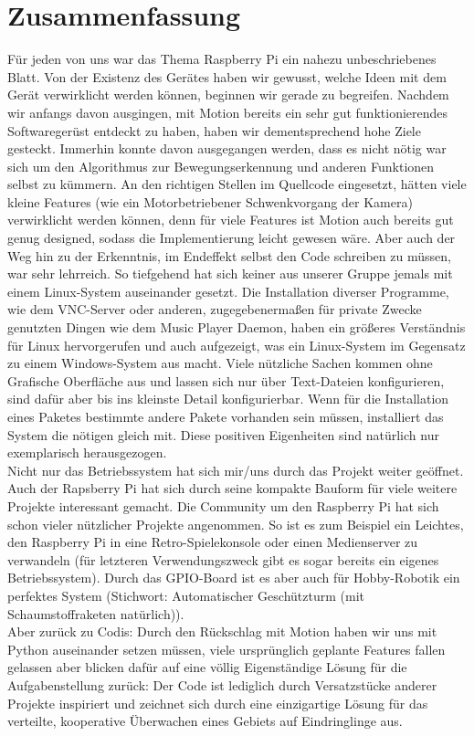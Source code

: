 \documentclass[journal]{IEEEtran}
\begin{document}
\section{Zusammenfassung}
Für jeden von uns war das Thema Raspberry Pi ein nahezu unbeschriebenes Blatt. Von der Existenz des Gerätes haben wir gewusst, welche Ideen mit dem Gerät verwirklicht werden können, beginnen wir gerade zu begreifen. Nachdem wir anfangs davon ausgingen, mit Motion bereits ein sehr gut funktionierendes Softwaregerüst entdeckt zu haben, haben wir dementsprechend hohe Ziele gesteckt. Immerhin konnte davon ausgegangen werden, dass es nicht nötig war sich um den Algorithmus zur Bewegungserkennung und anderen Funktionen selbst zu kümmern. An den richtigen Stellen im Quellcode eingesetzt, hätten viele kleine Features (wie ein Motorbetriebener Schwenkvorgang der Kamera) verwirklicht werden können, denn für viele Features ist Motion auch bereits gut genug designed, sodass die Implementierung leicht gewesen wäre. Aber auch der Weg hin zu der Erkenntnis, im Endeffekt selbst den Code schreiben zu müssen, war sehr lehrreich. So tiefgehend hat sich keiner aus unserer Gruppe jemals mit einem Linux-System auseinander gesetzt. Die Installation diverser Programme, wie dem VNC-Server oder anderen, zugegebenermaßen für private Zwecke genutzten Dingen wie dem Music Player Daemon, haben ein größeres Verständnis für Linux hervorgerufen und auch aufgezeigt, was ein Linux-System im Gegensatz zu einem Windows-System aus macht. Viele nützliche Sachen kommen ohne Grafische Oberfläche aus und lassen sich nur über Text-Dateien konfigurieren, sind dafür aber bis ins kleinste Detail konfigurierbar. Wenn für die Installation eines Paketes bestimmte andere Pakete vorhanden sein müssen, installiert das System die nötigen gleich mit. Diese positiven Eigenheiten sind natürlich nur exemplarisch herausgezogen. \\Nicht nur das Betriebssystem hat sich mir/uns durch das Projekt weiter geöffnet. Auch der Rapsberry Pi hat sich durch seine kompakte Bauform für viele weitere Projekte interessant gemacht. Die Community um den Raspberry Pi hat sich schon vieler nützlicher Projekte angenommen. So ist es zum Beispiel ein Leichtes, den Raspberry Pi in eine Retro-Spielekonsole oder einen Medienserver zu verwandeln (für letzteren Verwendungszweck gibt es sogar bereits ein eigenes Betriebssystem). Durch das GPIO-Board ist es aber auch für Hobby-Robotik ein perfektes System (Stichwort: Automatischer Geschützturm (mit Schaumstoffraketen natürlich)). \\Aber zurück zu Codis: Durch den Rückschlag mit Motion haben wir uns mit Python auseinander setzen müssen, viele ursprünglich geplante Features fallen gelassen aber blicken dafür auf eine völlig Eigenständige Lösung für die Aufgabenstellung zurück: Der Code ist lediglich durch Versatzstücke anderer Projekte inspiriert und zeichnet sich durch eine einzigartige Lösung für das verteilte, kooperative Überwachen eines Gebiets auf Eindringlinge aus.




\printbibliography
\end{document}
